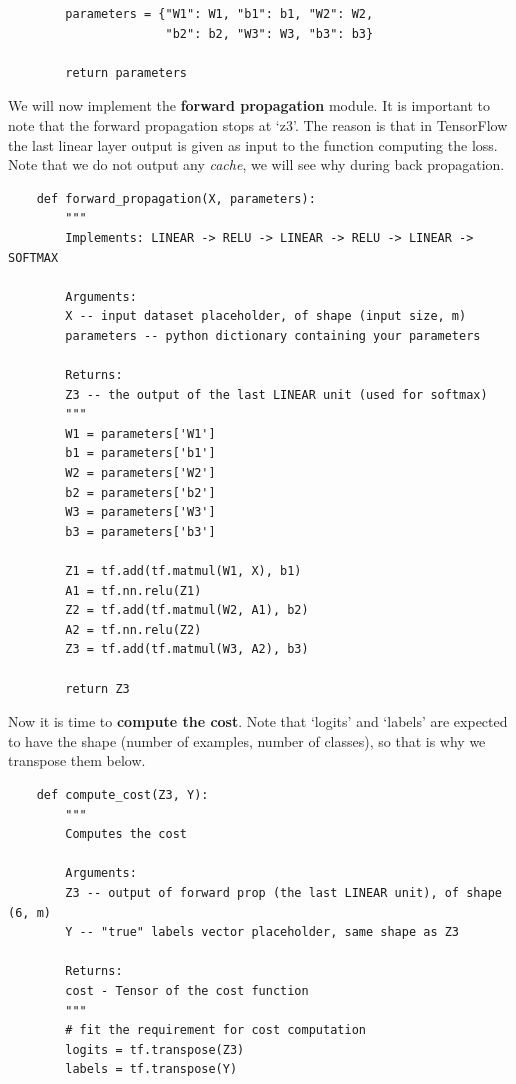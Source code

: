 \documentclass[11pt, a4paper]{article}
\begin{document}
\begin{spacing}{1.1}
\begin{lstlisting}
		parameters = {"W1": W1,	"b1": b1, "W2": W2,
		              "b2": b2, "W3": W3, "b3": b3}
	
		return parameters \end{lstlisting} \vspace*{1mm}
	We will now implement the \textbf{forward propagation} module. It is important to note that the forward propagation stops at `z3'. The reason is that in TensorFlow the last linear layer output is given as input to the function computing the loss. Note that we do not output any \textit{cache}, we will see why during back propagation.
	\begin{lstlisting}
	def forward_propagation(X, parameters):
		"""
		Implements: LINEAR -> RELU -> LINEAR -> RELU -> LINEAR -> SOFTMAX
		
		Arguments:
		X -- input dataset placeholder, of shape (input size, m)
		parameters -- python dictionary containing your parameters 
		
		Returns:
		Z3 -- the output of the last LINEAR unit (used for softmax)
		"""
		W1 = parameters['W1']
		b1 = parameters['b1']
		W2 = parameters['W2']
		b2 = parameters['b2']
		W3 = parameters['W3']
		b3 = parameters['b3']
		
		Z1 = tf.add(tf.matmul(W1, X), b1) 
		A1 = tf.nn.relu(Z1) 
		Z2 = tf.add(tf.matmul(W2, A1), b2)
		A2 = tf.nn.relu(Z2) 
		Z3 = tf.add(tf.matmul(W3, A2), b3) 

		return Z3 \end{lstlisting} \newpage

	\noindent Now it is time to \textbf{compute the cost}. Note that `logits' and `labels' are expected to have the shape (number of examples, number of classes), so that is why we transpose them below.
	\begin{lstlisting}
	def compute_cost(Z3, Y):
		"""
		Computes the cost
		
		Arguments:
		Z3 -- output of forward prop (the last LINEAR unit), of shape (6, m)
		Y -- "true" labels vector placeholder, same shape as Z3
		
		Returns:
		cost - Tensor of the cost function
		"""
		# fit the requirement for cost computation 
		logits = tf.transpose(Z3)
		labels = tf.transpose(Y)
		

\end{lstlisting}
\end{spacing}
\end{document}
